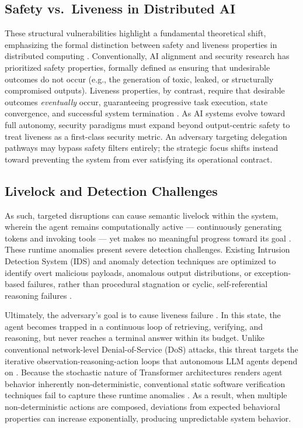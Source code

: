 \documentclass[conference]{IEEEtran}
\begin{document}
\subsection{Safety vs.\ Liveness in Distributed AI}

These structural vulnerabilities highlight a fundamental theoretical shift, emphasizing the formal distinction between safety and liveness properties in distributed computing \cite{lamport1977proving}. Conventionally, AI alignment and security research has prioritized safety properties, formally defined as ensuring that undesirable outcomes do not occur (e.g., the generation of toxic, leaked, or structurally compromised outputs). Liveness properties, by contrast, require that desirable outcomes \emph{eventually} occur, guaranteeing progressive task execution, state convergence, and successful system termination \cite{lamport1977proving}. As AI systems evolve toward full autonomy, security paradigms must expand beyond output-centric safety to treat liveness as a first-class security metric. An adversary targeting delegation pathways may bypass safety filters entirely; the strategic focus shifts instead toward preventing the system from ever satisfying its operational contract.

\subsection{Livelock and Detection Challenges}

As such, targeted disruptions can cause semantic livelock within the system, wherein the agent remains computationally active — continuously generating tokens and invoking tools — yet makes no meaningful progress toward its goal \cite{khanna2026zombie}. These runtime anomalies present severe detection challenges. Existing Intrusion Detection System (IDS) and anomaly detection techniques are optimized to identify overt malicious payloads, anomalous output distributions, or exception-based failures, rather than procedural stagnation or cyclic, self-referential reasoning failures \cite{gao2024denial}.

Ultimately, the adversary's goal is to cause liveness failure \cite{lamport1977proving}. In this state, the agent becomes trapped in a continuous loop of retrieving, verifying, and reasoning, but never reaches a terminal answer within its budget. Unlike conventional network-level Denial-of-Service (DoS) attacks, this threat targets the iterative observation-reasoning-action loops that autonomous LLM agents depend on \cite{gao2024denial, shumailov2021sponge}. Because the stochastic nature of Transformer architectures renders agent behavior inherently non-deterministic, conventional static software verification techniques fail to capture these runtime anomalies \cite{koohestani2025agentguard}. As a result, when multiple non-deterministic actions are composed, deviations from expected behavioral properties can increase exponentially, producing unpredictable system behavior.
\end{document}
